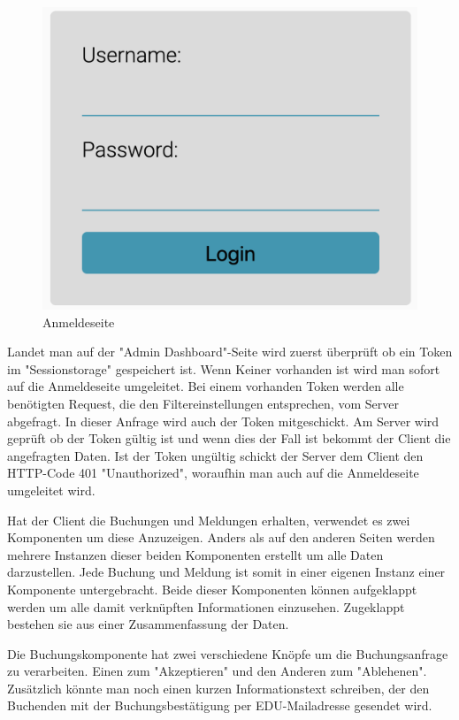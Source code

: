 \begin{figure}[H]
    \centering
    \includegraphics[width=120mm]{media/WebComponents/Login_light.png}
    \caption{Anmeldeseite}
\end{figure}

Landet man auf der "Admin Dashboard"-Seite wird zuerst überprüft ob ein Token im "Sessionstorage" gespeichert ist. Wenn Keiner vorhanden ist wird man sofort auf die Anmeldeseite umgeleitet. Bei einem vorhanden Token werden alle benötigten Request, die den Filtereinstellungen entsprechen, vom Server abgefragt. In dieser Anfrage wird auch der Token mitgeschickt. Am Server wird geprüft ob der Token gültig ist und wenn dies der Fall ist bekommt der Client die angefragten Daten. Ist der Token ungültig schickt der Server dem Client den HTTP-Code 401 "Unauthorized", woraufhin man auch auf die Anmeldeseite umgeleitet wird.

Hat der Client die Buchungen und Meldungen erhalten, verwendet es zwei Komponenten um diese Anzuzeigen. Anders als auf den anderen Seiten werden mehrere Instanzen dieser beiden Komponenten erstellt um alle Daten darzustellen. Jede Buchung und Meldung ist somit in einer eigenen Instanz einer Komponente untergebracht. Beide dieser Komponenten können aufgeklappt werden um alle damit verknüpften Informationen einzusehen. Zugeklappt bestehen sie aus einer Zusammenfassung der Daten. 

Die Buchungskomponente hat zwei verschiedene Knöpfe um die Buchungsanfrage zu verarbeiten. Einen zum "Akzeptieren" und den Anderen zum "Ablehenen". Zusätzlich könnte man noch einen kurzen Informationstext schreiben, der den Buchenden mit der Buchungsbestätigung per EDU-Mailadresse gesendet wird. 

